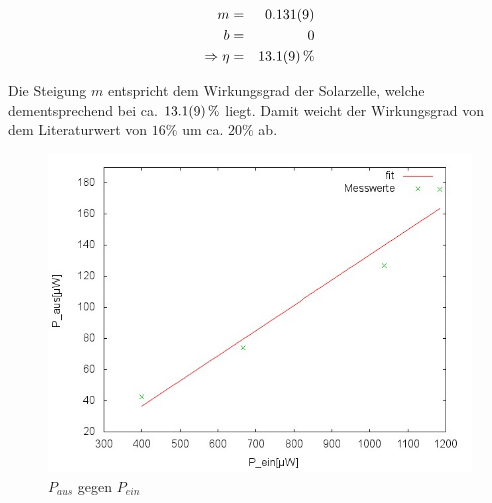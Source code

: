 	\begin{eqnarray*}
		m &=& \SI{0.131 (9)}{}\\
		b &=& 0\\
		\Rightarrow \eta &=& \SI{13.1 (9)}{\%}
	\end{eqnarray*}

	Die Steigung $m$ entspricht dem Wirkungsgrad der Solarzelle, welche dementsprechend bei ca. $\SI{13.1 (9)}{\%}$ liegt.
	Damit weicht der Wirkungsgrad von dem Literaturwert von $16\%$\cite{artikel2} um ca. $20\%$ ab.\\

	

	\begin{figure}[htbp]
		\centering
		\includegraphics[width = 12cm]{img/wirkung.jpg}
		\caption{$P_{aus}$ gegen $P_{ein}$}
		\label{wirkung}
	\end{figure}
